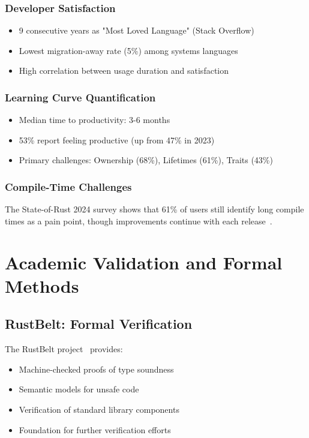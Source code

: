 \documentclass[11pt]{article}
\begin{document}
\subsubsection{Developer Satisfaction}
\begin{itemize}
    \item 9 consecutive years as "Most Loved Language" (Stack Overflow)
    \item Lowest migration-away rate (5\%) among systems languages~\cite{jetbrains2023}
    \item High correlation between usage duration and satisfaction
\end{itemize}

\subsubsection{Learning Curve Quantification}
\begin{itemize}
    \item Median time to productivity: 3-6 months~\cite{rustsurvey2024}
    \item 53\% report feeling productive (up from 47\% in 2023)
    \item Primary challenges: Ownership (68\%), Lifetimes (61\%), Traits (43\%)
\end{itemize}

\subsubsection{Compile-Time Challenges}
The State-of-Rust 2024 survey shows that 61\% of users still identify long compile times as a pain point, though improvements continue with each release~\cite{rustsurvey2024}.

\section{Academic Validation and Formal Methods}

\subsection{RustBelt: Formal Verification}

The RustBelt project~\cite{jung2018rustbelt} provides:
\begin{itemize}
    \item Machine-checked proofs of type soundness
    \item Semantic models for unsafe code
    \item Verification of standard library components
    \item Foundation for further verification efforts
\end{itemize}
\end{document}
